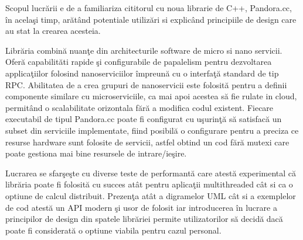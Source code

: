 Scopul lucr\u{a}rii e de a familiariza cititorul cu noua librarie de C++, Pandora.cc, \^{i}n acela\c{s}i timp, ar\u{a}t\^{a}nd potentiale utiliz\u{a}ri si explic\^{a}nd principiile de design care au stat la crearea acesteia.

Libr\u{a}ria combin\u{a} nuan\c{t}e din architecturile software de micro si nano servicii. Ofer\u{a} capabilit\u{a}ti rapide \c{s}i configurabile de papalelism pentru dezvoltarea applica\c{t}iilor folosind nanoserviciilor \^{i}mpreun\u{a} cu o interfa\c{t}\u{a} standard de tip RPC. Abilitatea de a crea grupuri de nanoservicii este folosit\u{a} pentru a definii componente similare cu microserviciile, ca mai apoi acestea s\u{a} fie rulate in cloud, permit\^{a}nd o scalabilitate orizontala f\u{a}r\u{a} a modifica codul existent. Fiecare executabil de tipul Pandora.cc poate fi configurat cu u\c{s}urin\c{t}\u{a} s\u{a} satisfac\u{a} un subset din serviciile implementate, fiind posibil\u{a} o configurare pentru a preciza ce resurse hardware sunt folosite de servicii, astfel obtind un cod f\u{a}r\u{a} mutexi care poate gestiona mai bine resursele de intrare/ie\c{s}ire.

Lucrarea se sfar\c{s}e\c{s}te cu diverse teste de performant\u{a} care atest\u{a} experimental c\u{a} libr\u{a}ria poate fi folosit\u{a} cu succes at\^{a}t pentru aplica\c{t}ii multithreaded c\^{a}t si ca o optiune de calcul distribuit. Prezen\c{t}a at\^{a}t a digramelor UML c\^{a}t si a exemplelor de cod atest\u{a} un API modern \c{s}i usor de folosit iar introducerea \^{i}n lucrare a principilor de design din spatele libr\u{a}riei permite utilizatorilor s\u{a} decid\u{a} dac\u{a} poate fi considerat\u{a} o optiune viabila pentru cazul personal. 